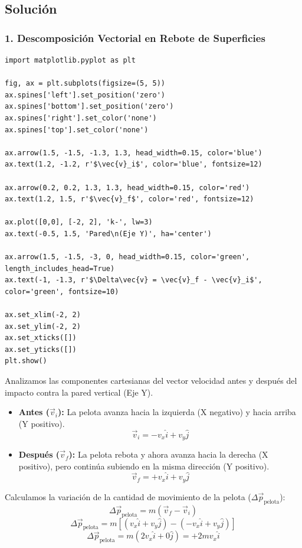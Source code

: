 \documentclass[12pt, a4paper]{article}
\begin{document}
\subsection*{Solución}

\subsubsection*{1. Descomposición Vectorial en Rebote de Superficies}

\begin{verbatim}
import matplotlib.pyplot as plt

fig, ax = plt.subplots(figsize=(5, 5))
ax.spines['left'].set_position('zero')
ax.spines['bottom'].set_position('zero')
ax.spines['right'].set_color('none')
ax.spines['top'].set_color('none')

ax.arrow(1.5, -1.5, -1.3, 1.3, head_width=0.15, color='blue')
ax.text(1.2, -1.2, r'$\vec{v}_i$', color='blue', fontsize=12)

ax.arrow(0.2, 0.2, 1.3, 1.3, head_width=0.15, color='red')
ax.text(1.2, 1.5, r'$\vec{v}_f$', color='red', fontsize=12)

ax.plot([0,0], [-2, 2], 'k-', lw=3)
ax.text(-0.5, 1.5, 'Pared\n(Eje Y)', ha='center')

ax.arrow(1.5, -1.5, -3, 0, head_width=0.15, color='green', length_includes_head=True)
ax.text(-1, -1.3, r'$\Delta\vec{v} = \vec{v}_f - \vec{v}_i$', color='green', fontsize=10)

ax.set_xlim(-2, 2)
ax.set_ylim(-2, 2)
ax.set_xticks([])
ax.set_yticks([])
plt.show()
\end{verbatim}

Analizamos las componentes cartesianas del vector velocidad antes y después del impacto contra la pared vertical (Eje Y).
\begin{itemize}
    \item \textbf{Antes ($\vec{v}_i$):} La pelota avanza hacia la izquierda (X negativo) y hacia arriba (Y positivo). 
    $$ \vec{v}_i = -v_x \hat{i} + v_y \hat{j} $$
    \item \textbf{Después ($\vec{v}_f$):} La pelota rebota y ahora avanza hacia la derecha (X positivo), pero continúa subiendo en la misma dirección (Y positivo).
    $$ \vec{v}_f = +v_x \hat{i} + v_y \hat{j} $$
\end{itemize}

Calculamos la variación de la cantidad de movimiento de la pelota ($\Delta\vec{p}_{\text{pelota}}$):
$$ \Delta\vec{p}_{\text{pelota}} = m(\vec{v}_f - \vec{v}_i) $$
$$ \Delta\vec{p}_{\text{pelota}} = m [ (v_x \hat{i} + v_y \hat{j}) - (-v_x \hat{i} + v_y \hat{j}) ] $$
$$ \Delta\vec{p}_{\text{pelota}} = m (2v_x \hat{i} + 0 \hat{j}) = +2mv_x \hat{i} $$
\end{document}
